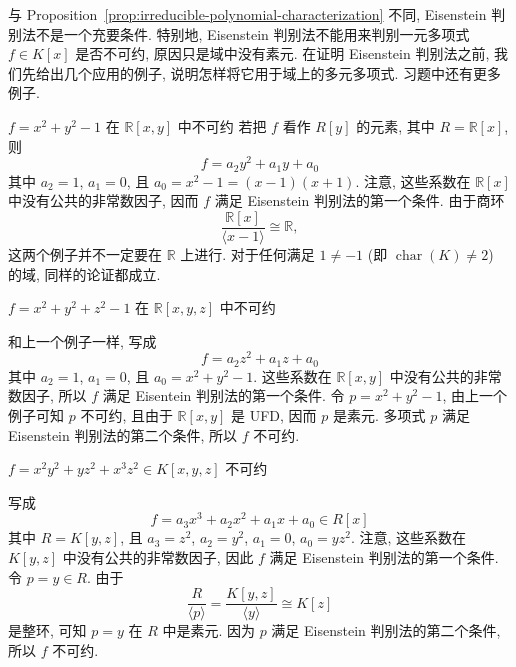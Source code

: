 与 Proposition~\ref{prop:irreducible-polynomial-characterization} 不同, Eisenstein 判别法不是一个充要条件. 特别地, Eisenstein 判别法不能用来判别一元多项式 $f\in K[x]$ 是否不可约, 原因只是域中没有素元. 在证明 Eisenstein 判别法之前, 我们先给出几个应用的例子, 说明怎样将它用于域上的多元多项式. 习题中还有更多例子.

\begin{Example}{{\textmd{$f=x^{2}+y^{2}-1$} 在 \textmd{$\mathbb{R}[x,y]$} 中不可约}}\label{ex:eisenstein-unit-circle}
  若把 $f$ 看作 $R[y]$ 的元素, 其中 $R=\mathbb{R}[x]$, 则
  \[
    f=a_{2}y^{2}+a_{1}y+a_{0}
  \]
  其中 $a_{2}=1$, $a_{1}=0$, 且 $a_{0}=x^{2}-1=(x-1)(x+1)$. 注意, 这些系数在 $\mathbb{R}[x]$ 中没有公共的非常数因子, 因而 $f$ 满足 Eisenstein 判别法的第一个条件. 由于商环
  \[
    \frac{\mathbb{R}[x]}{\langle x-1\rangle}\cong\mathbb{R},
  \]
    {这两个例子并不一定要在 $\mathbb{R}$ 上进行. 对于任何满足 $1\ne-1$ (即 $\operatorname{char}(K)\ne2$) 的域, 同样的论证都成立.}
\end{Example}

\begin{Example}{{\textmd{$f=x^{2}+y^{2}+z^{2}-1$} 在 \textmd{$\mathbb{R}[x,y,z]$} 中不可约}}
  \leavevmode\label{ex:eisenstein-unit-sphere}\strut\par\nopagebreak[4]\noindent
  和上一个例子一样, 写成
  \[
    f=a_{2}z^{2}+a_{1}z+a_{0}
  \]
  其中 $a_{2}=1$, $a_{1}=0$, 且 $a_{0}=x^{2}+y^{2}-1$. 这些系数在 $\mathbb{R}[x,y]$ 中没有公共的非常数因子, 所以 $f$ 满足 Eisentein 判别法的第一个条件. 令 $p=x^{2}+y^{2}-1$, 由上一个例子可知 $p$ 不可约, 且由于 $\mathbb{R}[x,y]$ 是 UFD, 因而 $p$ 是素元. 多项式 $p$ 满足 Eisenstein 判别法的第二个条件, 所以 $f$ 不可约.
\end{Example}

\begin{Example}{{\textmd{$f=x^{2}y^{2}+yz^{2}+x^{3}z^{2}\in K[x,y,z]$} 不可约}}
  \leavevmode\label{ex:eisenstein-three-variable-polynomial}\strut\par\nopagebreak[4]\noindent
  写成
  \[
    f=a_{3}x^{3}+a_{2}x^{2}+a_{1}x+a_{0}\in R[x]
  \]
  其中 $R=K[y,z]$, 且 $a_{3}=z^{2}$, $a_{2}=y^{2}$, $a_{1}=0$, $a_{0}=yz^{2}$. 注意, 这些系数在 $K[y,z]$ 中没有公共的非常数因子, 因此 $f$ 满足 Eisenstein 判别法的第一个条件. 令 $p=y\in R$. 由于
  \[
    \frac{R}{\langle p\rangle}=\frac{K[y,z]}{\langle y\rangle}\cong K[z]
  \]
  是整环, 可知 $p=y$ 在 $R$ 中是素元. 因为 $p$ 满足 Eisenstein 判别法的第二个条件, 所以 $f$ 不可约.
\end{Example}

